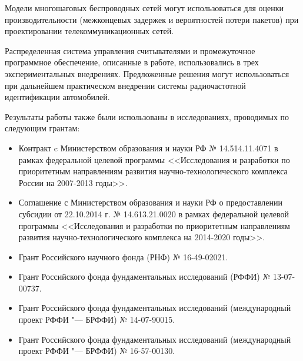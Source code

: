 Модели многошаговых беспроводных сетей могут использоваться для оценки производительности (межконцевых задержек и вероятностей потери пакетов) при проектировании телекоммуникационных сетей.

Распределенная система управления считывателями и промежуточное программное обеспечение, описанные в работе, использовались в трех экспериментальных внедрениях. Предложенные решения могут использоваться при дальнейшем практическом внедрении системы радиочастотной идентификации автомобилей.

Результаты работы также были использованы в исследованиях, проводимых по следующим грантам:

\begin{itemize}
    \item Контракт c Министерством образования и науки РФ № 14.514.11.4071 в рамках федеральной целевой программы <<Исследования и разработки по приоритетным направлениям развития научно-технологического комплекса России на 2007-2013 годы>>.
	\item Соглашение с Министерством образования и науки РФ о предоставлении субсидии от 22.10.2014 г. № 14.613.21.0020 в рамках федеральной целевой программы <<Исследования и разработки по приоритетным направлениям развития научно-технологического комплекса на 2014-2020 годы>>.
	\item Грант Российского научного фонда (РНФ) № 16-49-02021.
	\item Грант Российского фонда фундаментальных исследований (РФФИ) № 13-07-00737.
	\item Грант Российского фонда фундаментальных исследований (международный проект РФФИ "--- БРФФИ) № 14-07-90015.
	\item Грант Российского фонда фундаментальных исследований (международный проект РФФИ "--- БРФФИ) № 16-57-00130.


\end{itemize}
